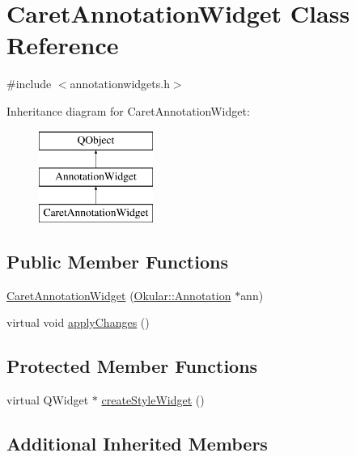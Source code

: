 \hypertarget{classCaretAnnotationWidget}{\section{Caret\+Annotation\+Widget Class Reference}
\label{classCaretAnnotationWidget}
}


{\ttfamily \#include $<$annotationwidgets.\+h$>$}

Inheritance diagram for Caret\+Annotation\+Widget\+:\begin{figure}[H]
\begin{center}
\leavevmode
\includegraphics[height=3.000000cm]{classCaretAnnotationWidget}
\end{center}
\end{figure}
\subsection*{Public Member Functions}
\begin{DoxyCompactItemize}
\item 
\hyperlink{classCaretAnnotationWidget_aff83e9a2d16baea21204c3e370c93e01}{Caret\+Annotation\+Widget} (\hyperlink{classOkular_1_1Annotation}{Okular\+::\+Annotation} $\ast$ann)
\item 
virtual void \hyperlink{classCaretAnnotationWidget_ace74af8590fa2bae736aa3ab6f2ca862}{apply\+Changes} ()
\end{DoxyCompactItemize}
\subsection*{Protected Member Functions}
\begin{DoxyCompactItemize}
\item 
virtual Q\+Widget $\ast$ \hyperlink{classCaretAnnotationWidget_a1de63a32fcebc687453ce9525604f02c}{create\+Style\+Widget} ()
\end{DoxyCompactItemize}
\subsection*{Additional Inherited Members}


